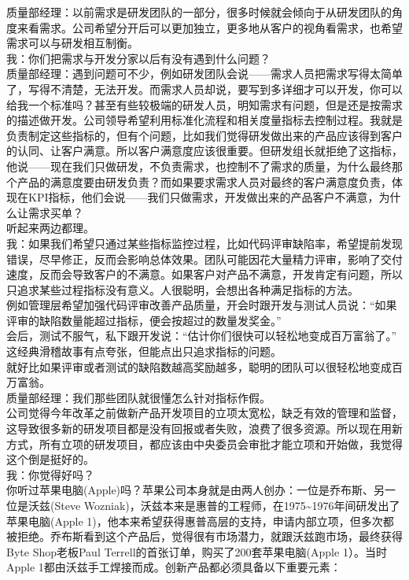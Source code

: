 质量部经理：以前需求是研发团队的一部分，很多时候就会倾向于从研发团队的角度来看需求。公司希望分开后可以更加独立，更多地从客户的视角看需求，也希望需求可以与研发相互制衡。\\
我：你们把需求与开发分家以后有没有遇到什么问题？\\
质量部经理：遇到问题可不少，例如研发团队会说------需求人员把需求写得太简单了，写得不清楚，无法开发。而需求人员却说，要写到多详细才可以开发，你可以给我一个标准吗？甚至有些较极端的研发人员，明知需求有问题，但是还是按需求的描述做开发。公司领导希望利用标准化流程和相关度量指标去控制过程。我就是负责制定这些指标的，但有个问题，比如我们觉得研发做出来的产品应该得到客户的认同、让客户满意。所以客户满意度应该很重要。但研发组长就拒绝了这指标，他说------现在我们只做研发，不负责需求，也控制不了需求的质量，为什么最终那个产品的满意度要由研发负责？而如果要求需求人员对最终的客户满意度负责，体现在KPI指标，他们会说------我们只做需求，开发做出来的产品客户不满意，为什么让需求买单？\\
听起来两边都理。\\
我：如果我们希望只通过某些指标监控过程，比如代码评审缺陷率，希望提前发现错误，尽早修正，反而会影响总体效果。团队可能因花大量精力评审，影响了交付速度，反而会导致客户的不满意。如果客户对产品不满意，开发肯定有问题，所以只追求某些过程指标没有意义。人很聪明，会想出各种满足指标的方法。\\
例如管理层希望加强代码评审改善产品质量，开会时跟开发与测试人员说：``如果评审的缺陷数量能超过指标，便会按超过的数量发奖金。''\\
会后，测试不服气，私下跟开发说：``估计你们很快可以轻松地变成百万富翁了。''\\
这经典滑稽故事有点夸张，但能点出只追求指标的问题。\\
就好比如果评审或者测试的缺陷数越高奖励越多，聪明的团队可以很轻松地变成百万富翁。\\
质量部经理：我们那些团队就很懂怎么针对指标作假。\\
公司觉得今年改革之前做新产品开发项目的立项太宽松，缺乏有效的管理和监督，这导致很多新的研发项目都是没有回报或者失败，浪费了很多资源。所以现在用新方式，所有立项的研发项目，都应该由中央委员会审批才能立项和开始做，我觉得这个倒是挺好的。\\
我：你觉得好吗？\\
你听过苹果电脑(Apple)吗？苹果公司本身就是由两人创办：一位是乔布斯、另一位是沃兹(Steve
Wozniak)，沃兹本来是惠普的工程师，在1975\textasciitilde{}1976年间研发出了苹果电脑(Apple
1)，他本来希望获得惠普高层的支持，申请内部立项，但多次都被拒绝。乔布斯看到这个产品后，觉得很有市场潜力，就跟沃兹跑市场，最终获得Byte
Shop老板Paul Terrell的首张订单，购买了200套苹果电脑(Apple 1）。当时Apple
1都由沃兹手工焊接而成。创新产品都必须具备以下重要元素：

